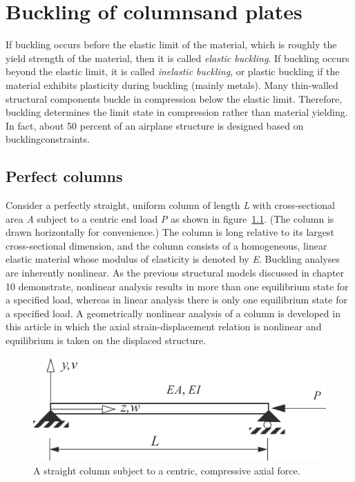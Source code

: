 \documentclass{AeroStructure-ERJohnson}
\begin{document}
\mainmatter

\setcounter{page}{289}
\setcounter{chapter}{10}

\chapter[Buckling of columns and plates]{Buckling of columns\break and plates} \label{ch11}

If buckling occurs before the elastic limit of the material, which is roughly the yield strength of the material, then it is called \textit{elastic buckling}. If buckling occurs beyond the elastic limit, it is called \textit{inelastic buckling}, or plastic buckling if the material exhibits plasticity during buckling (mainly metals). Many thin-walled structural components buckle in compression below the elastic limit. Therefore, buckling determines the limit state in compression rather than material yielding. In fact, about 50 percent of an airplane structure is designed based on buckling\break constraints.

\vspace*{-1pc}

\section{Perfect columns}\label{sec11.1}



Consider\enlargethispage{-1\baselineskip} a perfectly straight, uniform column of length \textit{L} with cross-sectional area \textit{A} subject to a centric end load \textit{P} as shown in figure~\ref{fig11.1}. (The column is drawn horizontally for convenience.) The column is long relative to its largest cross-sectional dimension, and the column consists of a homogeneous, linear elastic material whose modulus of elasticity is denoted by \textit{E}. Buckling analyses are inherently nonlinear. As the previous structural models discussed in chapter 10 demonstrate, nonlinear analysis results in more than one equilibrium state for a specified load, whereas in linear analysis there is only one equilibrium state for a specified load. A geometrically nonlinear analysis of a column is developed in this article in which the axial strain-displacement relation is nonlinear and equilibrium is taken on the displaced structure.


\begin{figure}[!h]
\centerline{\includegraphics{Figure_11-1.pdf}}
\caption{A straight column subject to a centric, compressive axial force.} \label{fig11.1}
\end{figure}
\end{document}
